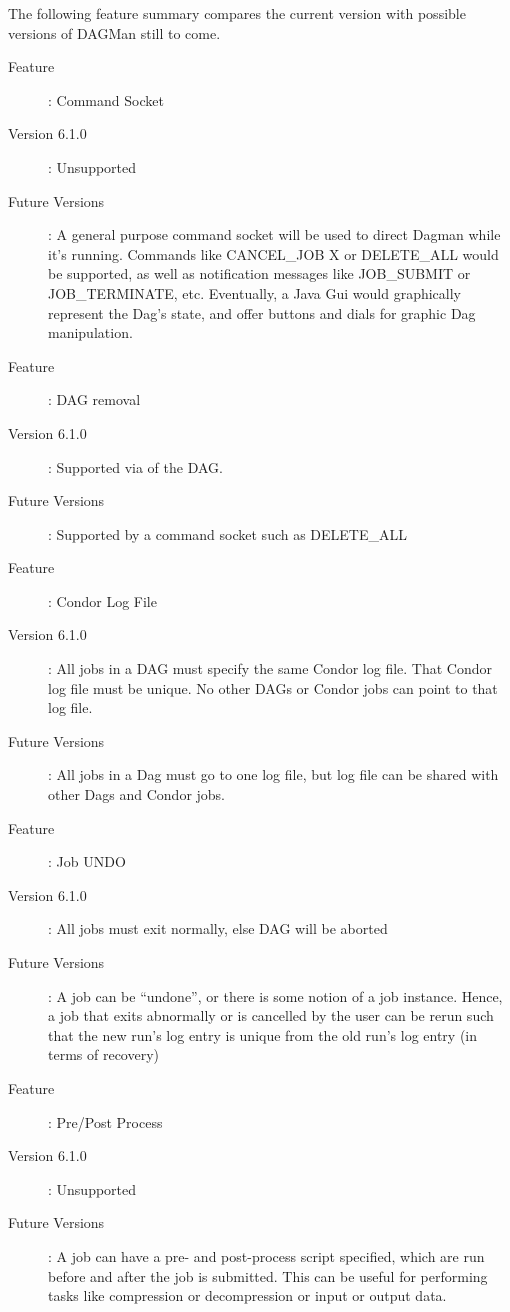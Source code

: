 The following feature summary compares the current version with possible
versions of DAGMan still to come.

\begin{description}
\item[Feature] : Command Socket
\item[Version 6.1.0] : Unsupported
\item[Future Versions] : A general purpose command socket will be used to
direct Dagman while it's running.  Commands like CANCEL\_JOB X or DELETE\_ALL
would be supported, as well as notification messages like JOB\_SUBMIT or
JOB\_TERMINATE, etc.  Eventually, a Java Gui would graphically represent the
Dag's state, and offer buttons and dials for graphic Dag manipulation.
\end{description}

\begin{description}
\item[Feature]: DAG removal
\item[Version 6.1.0]: Supported via  of the DAG.
\item[Future Versions]: Supported by a command socket such as DELETE\_ALL
\end{description}

\begin{description}
\item[Feature]: Condor Log File
\item[Version 6.1.0]: All jobs in a DAG must specify the same Condor log file.
That Condor log file must be unique.  No other DAGs or Condor jobs can point
to that log file.
\item[Future Versions]: All jobs in a Dag must go to one log file, but
log file can be shared with other Dags and Condor jobs.
\end{description}

\begin{description}
\item[Feature]: Job UNDO
\item[Version 6.1.0]: All jobs must exit normally, else DAG will be aborted
\item[Future Versions]: A job can be ``undone'', or there is some
notion of a job instance.  Hence, a job that exits abnormally or is
cancelled by the user can be rerun such that the new run's log entry
is unique from the old run's log entry (in terms of recovery)
\end{description}

\begin{description}
\item[Feature]: Pre/Post Process
\item[Version 6.1.0]: Unsupported
\item[Future Versions]: A job can have a pre- and post-process script
specified, which are run before and after the job is submitted.  This can be
useful for performing tasks like compression or decompression or input or
output data.
\end{description}

